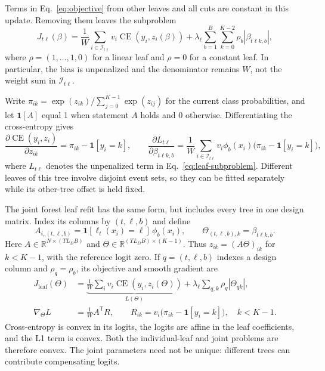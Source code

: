\documentclass[11pt,a4paper]{article}
\newcommand{\CE}{\operatorname{CE}}
\newcommand{\ind}{\mathbf{1}}
\begin{document}
Terms in Eq.~\eqref{eq:objective} from other leaves and all cuts are constant
in this update. Removing them leaves the subproblem
\begin{equation}
 J_{t\ell}(\beta)=\frac1W\sum_{i\in\mathcal I_{t\ell}}
 v_i\CE(y_i,z_i(\beta))
 +\lambda_\ell\sum_{b=1}^{B}\sum_{k=0}^{K-2}\rho_b|\beta_{t\ell k,b}|,
 \label{eq:leaf-subproblem}
\end{equation}
where $\rho=(1,\ldots,1,0)$ for a linear leaf and $\rho=0$ for a constant
leaf. In particular, the bias is unpenalized and the denominator remains
$W$, not the weight sum in $\mathcal I_{t\ell}$.

Write $\pi_{ik}=\exp(z_{ik})/\sum_{j=0}^{K-1}\exp(z_{ij})$ for the current
class probabilities, and let $\ind[A]$ equal 1 when statement $A$ holds and
0 otherwise. Differentiating the cross-entropy gives
\begin{equation}
 \frac{\partial\CE(y_i,z_i)}{\partial z_{ik}}
 =\pi_{ik}-\ind[y_i=k],\qquad
 \frac{\partial L_{t\ell}}{\partial\beta_{t\ell k,b}}
 =\frac1W\sum_{i\in\mathcal I_{t\ell}}
 v_i\phi_b(x_i)\big(\pi_{ik}-\ind[y_i=k]\big),
 \label{eq:leaf-gradient}
\end{equation}
where $L_{t\ell}$ denotes the unpenalized term in
Eq.~\eqref{eq:leaf-subproblem}. Different leaves of this tree involve disjoint
event sets, so they can be fitted separately while its other-tree offset is
held fixed.

The joint forest leaf refit has the same form, but includes every tree in
one design matrix. Index its columns by $(t,\ell,b)$ and define
\begin{equation}
 A_{i,(t,\ell,b)}=\ind[\ell_t(x_i)=\ell]\,\phi_b(x_i),\qquad
 \Theta_{(t,\ell,b),k}=\beta_{t\ell k,b}.
 \label{eq:joint-leaf-design}
\end{equation}
Here $A\in\mathbb R^{N\times(TL_DB)}$ and
$\Theta\in\mathbb R^{(TL_DB)\times(K-1)}$. Thus
$z_{ik}=(A\Theta)_{ik}$ for $k<K-1$, with the reference logit zero.
If $q=(t,\ell,b)$ indexes a design column and $\rho_q=\rho_b$, its objective
and smooth gradient are
\begin{align}
 J_{\mathrm{leaf}}(\Theta)
 &=\underbrace{\frac1W\sum_i v_i\CE(y_i,z_i(\Theta))}_{L(\Theta)}
   +\lambda_\ell\sum_{q,k}\rho_q|\Theta_{qk}|,
 \label{eq:joint-leaf-objective}\\
 \nabla_\Theta L&=\frac1W A^{\mathsf T}R,\qquad
 R_{ik}=v_i\big(\pi_{ik}-\ind[y_i=k]\big),\quad k<K-1.
 \label{eq:joint-leaf-gradient}
\end{align}
Cross-entropy is convex in its logits, the logits are affine in the leaf
coefficients, and the L1 term is convex. Both the individual-leaf and joint
problems are therefore convex. The joint parameters need not be unique:
different trees can contribute compensating logits.
\end{document}
